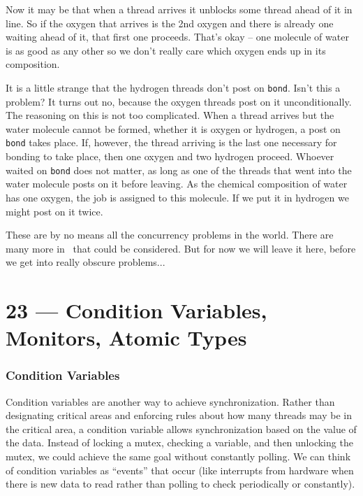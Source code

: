 \documentclass[a4paper]{report}
\begin{document}
Now it may be that when a thread arrives it unblocks some thread ahead of it in line. So if the oxygen that arrives is the 2nd oxygen and there is already one waiting ahead of it, that first one proceeds. That's okay -- one molecule of water is as good as any other so we don't really care which oxygen ends up in its composition.

It is a little strange that the hydrogen threads don't post on \texttt{bond}. Isn't this a problem? It turns out no, because the oxygen threads post on it unconditionally. The reasoning on this is not too complicated. When a thread arrives but the water molecule cannot be formed, whether it is oxygen or hydrogen, a post on \texttt{bond} takes place. If, however, the thread arriving is the last one necessary for bonding to take place, then one oxygen and two hydrogen proceed. Whoever waited on \texttt{bond} does not matter, as long as one of the threads that went into the water molecule posts on it before leaving. As the chemical composition of water has one oxygen, the job is assigned to this molecule. If we put it in hydrogen we might post on it twice.

These are by no means all the concurrency problems in the world. There are many more in~\cite{lbs} that could be considered. But for now we will leave it here, before  we get into really obscure problems...








\chapter*{23 --- Condition Variables, Monitors, Atomic Types}


\subsection*{Condition Variables}
Condition variables are another way to achieve synchronization. Rather than designating critical areas and enforcing rules about how many threads may be in the critical area, a condition variable allows synchronization based on the value of the data. Instead of locking a mutex, checking a variable, and then unlocking the mutex, we could achieve the same goal without constantly polling. We can think of condition variables as ``events'' that occur (like interrupts from hardware when there is new data to read rather than polling to check periodically or constantly).
\end{document}
